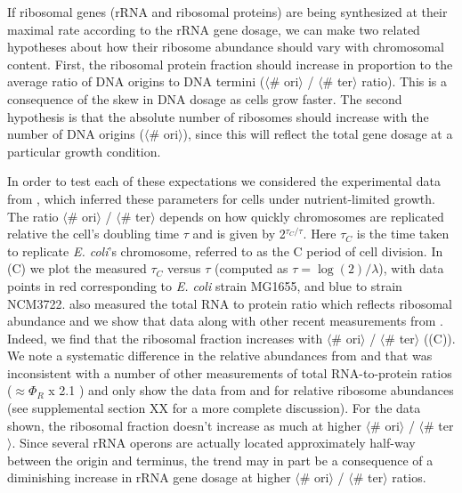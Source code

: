 If ribosomal genes (rRNA and ribosomal proteins) are being synthesized at
their maximal rate according to the rRNA gene dosage, we can make two related
hypotheses about how their ribosome abundance should vary with chromosomal
content. First, the ribosomal protein fraction should increase in proportion
to the average ratio of DNA origins to DNA termini ($\langle$\# ori$\rangle$
/ $\langle$\# ter$\rangle$ ratio). This is a consequence of the skew in DNA
dosage as cells grow faster. The second hypothesis is that the absolute
number of ribosomes should increase with the number of DNA origins
($\langle$\# ori$\rangle$), since this will reflect the total gene dosage at
a particular growth condition.

In order to test each of these expectations we considered the experimental data
from \cite{si2017}, which inferred these parameters for cells under
nutrient-limited growth. The ratio $\langle$\# ori$\rangle$ / $\langle$\# ter$\rangle$
depends on how quickly chromosomes are replicated relative the cell's
doubling time $\tau$ and is given by 2$^{\tau_C / \tau}$. Here $\tau_C$ is the
time taken to replicate \textit{E. coli}'s chromosome, referred to as the C
period of cell division.  In (C) we plot the measured $\tau_C$ versus
$\tau$ (computed as $\tau = \log (2) / \lambda$), with data points in red corresponding to \textit{E.
coli} strain MG1655, and blue to strain NCM3722. \cite{si2017} also
measured the total RNA to protein ratio  which reflects ribosomal abundance and
we show that data along with other recent  measurements from
\cite{dai2016,dai2018}. Indeed, 
we find that the ribosomal fraction increases with $\langle$\#
ori$\rangle$ / $\langle$\# ter$\rangle$ ((C)). We note a
systematic difference in the relative abundances from \cite{peebo2015} and
\cite{valgepea2013} that was inconsistent with a number of other
measurements of total RNA-to-protein ratios ($\approx \Phi_R$ x 2.1
\cite{dai2016}) and only show the data from \cite{schmidt2016} and \cite{li2014}
for relative ribosome abundances (see supplemental section XX
for a more complete discussion). For the data shown, the ribosomal fraction
doesn't increase as much at higher $\langle$\# ori$\rangle$ / $\langle$\#
ter$\rangle$. Since several rRNA operons are actually located approximately
half-way between the origin and terminus, the trend may in part be a consequence of a diminishing  increase in
rRNA gene dosage at higher $\langle$\# ori$\rangle$ / $\langle$\# ter$\rangle$
ratios.

